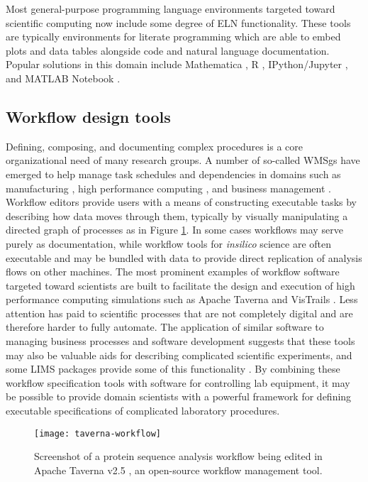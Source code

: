 \documentclass[../thesis]{subfiles}
\begin{document}
Most general-purpose programming language environments targeted toward
scientific computing now include some degree of ELN
functionality. These tools are typically environments for literate
programming \cite{Knuth:1984:LP:473.479} which are able to embed plots
and data tables alongside code and natural language
documentation. Popular solutions in this domain include Mathematica
\cite{mathematica}, R \cite{Rlang}, IPython/Jupyter \cite{IPython},
and MATLAB Notebook \cite{MATLAB}.

\subsection{Workflow design tools}
Defining, composing, and documenting complex procedures is a core
organizational need of many research groups. A number of so-called
\glspl{WMSg} have emerged to help manage task schedules and
dependencies in domains such as manufacturing
\cite{Allweyer:2010:BPM:1841147}, high performance computing
\cite{VisTrails}, and business management
\cite{cardoso2004workflow}. Workflow editors provide users with a
means of constructing executable tasks by describing how
data moves through them, typically by visually manipulating a directed
graph of processes as in Figure \ref{fig:TavernaWorkflow}. In some
cases workflows may serve purely as
documentation, while workflow tools for \textit{\gls{insilico}} science
are often executable and may be bundled with data to provide direct
replication of analysis flows on other machines. The most prominent
examples of workflow software
targeted toward scientists are built to facilitate the design and
execution of high performance computing simulations such as Apache
Taverna \cite{Taverna} and VisTrails \cite{VisTrails}. Less
attention has paid to scientific processes that are not completely digital
and are therefore harder to fully automate. The application
of similar software to managing business processes and software
development suggests that these tools may also be valuable aids for
describing complicated scientific experiments, and some \gls{LIMS} packages
provide some of this functionality \cite{CoreLIMS}. By combining these
workflow specification tools with software for controlling lab
equipment, it may be possible to provide domain scientists with a
powerful framework for defining executable specifications of
complicated laboratory procedures.

\begin{figure}
  \texttt{[image: taverna-workflow]}
  \caption[Editing a Taverna workflow]{
    Screenshot of a protein sequence analysis workflow
    \cite{ExampleWorkflow} being edited in
    Apache Taverna v2.5 \cite{Taverna}, an open-source workflow
    management tool.
    \label{fig:TavernaWorkflow}
  }
\end{figure}
\end{document}
